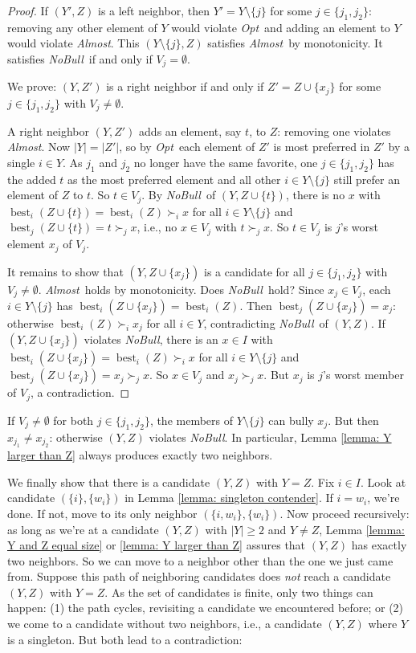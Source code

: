 \documentclass[english, 11pt]{article}
\theoremstyle{plain} %
\theoremstyle{definition}
\newcommand{\opt}{\textsl{Opt}}
\newcommand{\nb}{\textsl{NoBull}}
\newcommand{\alm}{\textsl{Almost}}
\DeclareMathOperator{\best}{best}
\begin{document}
\begin{proof}
If $(Y', Z)$ is a left neighbor, then $Y' = Y \setminus \{j\}$ for some $j \in \{j_1, j_2\}$: removing any other element of $Y$ would violate \opt\ and adding an element to $Y$ would violate \alm. This $(Y \setminus \{j\}, Z)$ satisfies \alm\ by monotonicity. It satisfies \nb\ if and only if $V_j = \emptyset$.

We prove: $(Y, Z')$ is a right neighbor if and only if $Z' = Z \cup \{x_j\}$ for some $j \in \{j_1, j_2\}$ with $V_j \neq \emptyset$.

A right neighbor $(Y, Z')$ adds an element, say $t$, to $Z$: removing one violates \alm. Now $|Y| = |Z'|$, so by \opt\ each element of $Z'$ is most preferred in $Z'$ by a single $i \in Y$. As $j_1$ and $j_2$ no longer have the same favorite, one $j \in \{j_1, j_2\}$ has the added $t$ as the most preferred element and all other $i \in Y \setminus \{j\}$ still prefer an element of $Z$ to $t$. So $t \in V_j$. By \nb\ of $(Y, Z \cup \{t\})$, there is no $x$ with $\best_i(Z \cup \{t\}) = \best_i(Z) \succ_i x$ for all $i \in Y \setminus \{j\}$ and $\best_j(Z \cup \{t\}) = t \succ_j x$, i.e., no $x \in V_j$ with $t \succ_j x$. So $t \in V_j$ is $j$'s worst element $x_j$ of $V_j$.

It remains to show that $(Y, Z \cup \{x_j\})$ is a candidate for all $j \in \{j_1, j_2\}$ with $V_j \neq \emptyset$. \alm\ holds by monotonicity. Does \nb\ hold? Since $x_j \in V_j$, each $i \in Y \setminus \{j\}$ has $\best_i(Z \cup \{x_j\}) = \best_i(Z)$. Then $\best_j(Z \cup \{x_j\}) = x_j$: otherwise $\best_i(Z) \succ_i x_j$ for all $i \in Y$, contradicting \nb\ of $(Y,Z)$. If $(Y, Z \cup \{x_j\})$ violates \nb, there is an $x \in I$ with $\best_i(Z \cup \{x_j\}) = \best_i(Z) \succ_i x$ for all $i \in Y \setminus \{j\}$ and $\best_j(Z \cup \{x_j\}) = x_j \succ_j x$. So $x \in V_j$ and $x_j \succ_j x$. But $x_j$ is $j$'s worst member of $V_j$, a contradiction.
\end{proof}

If $V_j \neq \emptyset$ for both $j \in \{j_1, j_2\}$, the members of $Y \setminus \{j\}$ can bully $x_j$. But then $x_{j_1} \neq x_{j_2}$: otherwise $(Y,Z)$ violates \nb. In particular, Lemma \ref{lemma: Y larger than Z} always produces exactly two neighbors.

We finally show that there is a candidate $(Y,Z)$ with $Y = Z$. Fix $i \in I$. Look at candidate $(\{i\}, \{w_i\})$ in Lemma \ref{lemma: singleton contender}. If $i = w_i$, we're done. If not, move to its only neighbor $(\{i, w_i\}, \{w_i\})$. Now proceed recursively: as long as we're at a candidate $(Y,Z)$ with $|Y| \geq 2$ and $Y \neq Z$, Lemma \ref{lemma: Y and Z equal size} or \ref{lemma: Y larger than Z} assures that $(Y,Z)$ has exactly two neighbors. So we can move to a neighbor other than the one we just came from. Suppose this path of neighboring candidates does \emph{not\/} reach a candidate $(Y,Z)$ with $Y = Z$. As the set of candidates is finite, only two things can happen: (1) the path cycles, revisiting a candidate we encountered before; or (2) we come to a candidate without two neighbors, i.e., a candidate $(Y,Z)$ where $Y$ is a singleton. But both lead to a contradiction:
\end{document}
